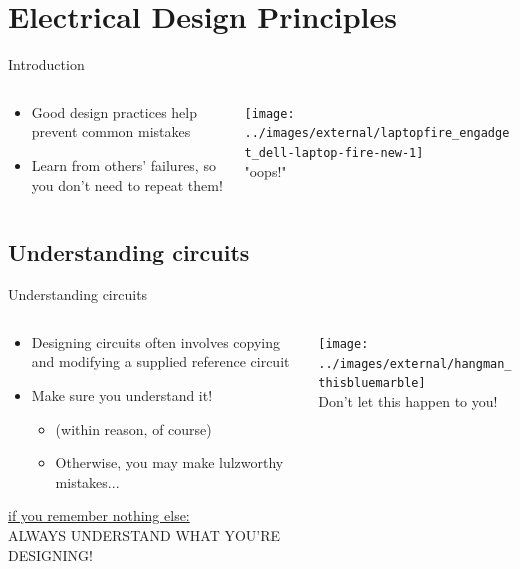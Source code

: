 \documentclass{beamer}
\begin{document}
\section{Electrical Design Principles}
\begin{frame}{Introduction}
  \begin{columns}[T]
    \begin{column}{.6\textwidth}
      \begin{itemize}
        \item Good design practices help prevent common mistakes
        \item Learn from others' failures, so you don't need to repeat them!
      \end{itemize}
    \end{column}

    \begin{column}{0.4\textwidth} \centering
      \texttt{[image: ../images/external/laptopfire\_engadget\_dell-laptop-fire-new-1]} \\
      "oops!"
    \end{column}
  \end{columns}
\end{frame}

\subsection{Understanding circuits}
\begin{frame}{Understanding circuits}
  \begin{columns}[T]
    \begin{column}{.6\textwidth}
      \begin{itemize}
        \item Designing circuits often involves copying and modifying a supplied reference circuit
        \item Make sure you understand it!
        \begin{itemize}
          \item (within reason, of course)
          \item Otherwise, you may make lulzworthy mistakes...
        \end{itemize}
      \end{itemize}
      \begin{tcolorbox}[] \centering
      \underline{if you remember nothing else:} \\
      ALWAYS UNDERSTAND WHAT YOU'RE DESIGNING!
      \end{tcolorbox}
    \end{column}

    \begin{column}{0.4\textwidth} \centering
      \texttt{[image: ../images/external/hangman\_thisbluemarble]} \\
      Don't let this happen to you!
    \end{column}
  \end{columns}
\end{frame}
\end{document}
